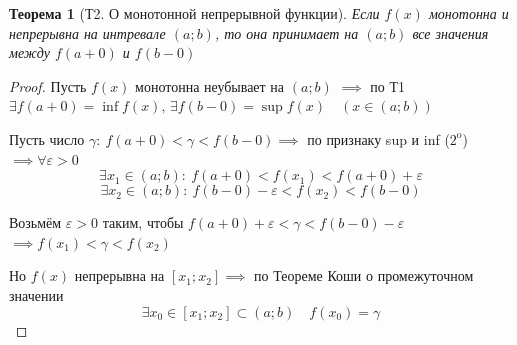 \documentclass[a4paper,oneside]{article}
\newcommand{\prop}[1]{#1^{\text{o}}}
\newcommand{\eps}{\varepsilon}
\newtheorem{theorem}{Теорема}[subsection]
\theoremstyle{definition}
\theoremstyle{definition}
\theoremstyle{definition}
\begin{document}
\begin{theorem}[Т2. О монотонной непрерывной функции]
    Если $f(x)$ монотонна и непрерывна на интревале $(a; b)$, то она принимает на $(a; b)$
    все значения между $f(a + 0)$ и $f(b - 0)$
\end{theorem}
\begin{proof}
    Пусть $f(x)$ монотонна неубывает на $(a; b)$ $\implies$
    по Т1 $\exists f(a + 0) = \inf f(x), \, \exists f(b - 0) = \sup f(x) \quad (x \in (a; b))$

    Пусть число $\gamma:\: f(a + 0) < \gamma < f(b - 0) \implies$ по признаку sup и inf ($\prop{2}$)
    $\implies \forall \eps > 0$
    \[ \exists x_1 \in (a; b): \: f(a + 0) < f(x_1) < f(a + 0) + \eps \]
    \[ \exists x_2 \in (a; b): \: f(b - 0) - \eps < f(x_2) < f(b - 0) \]

    Возьмём $\eps > 0$ таким, чтобы $f(a + 0) + \eps < \gamma < f(b - 0) - \eps$
    $\implies f(x_1) < \gamma < f(x_2)$

    Но $f(x)$ непрерывна на $[x_1; x_2] \implies$ по Теореме Коши о промежуточном значении
    \[ \exists x_0 \in [x_1; x_2] \subset (a; b) \quad f(x_0) = \gamma \]
\end{proof}
\end{document}
